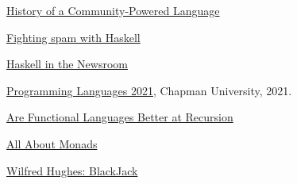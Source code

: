 \documentclass{article}
\begin{document}
\begin{thebibliography}{99}

\href{https://serokell.io/blog/haskell-history}{History of a Community-Powered Language}

\href{https://engineering.fb.com/2015/06/26/security/fighting-spam-with-haskell/}{Fighting spam with Haskell}

{\href{https://www.infoq.com/presentations/haskell-newsroom-nyt/}{Haskell in the Newsroom}}

\href{https://github.com/alexhkurz/programming-languages-2021/blob/main/README.md}{Programming Languages 2021}, Chapman University, 2021.

\href{https://softwareengineering.stackexchange.com/questions/149167/are-functional-languages-better-at-recursion}{Are Functional Languages Better at Recursion}

\href{https://wiki.haskell.org/All_About_Monads}{All About Monads}

\href{https://github.com/Wilfred/Blackjack/blob/master/Blackjack.hs}{
Wilfred Hughes: BlackJack}

\end{thebibliography}
\end{document}
